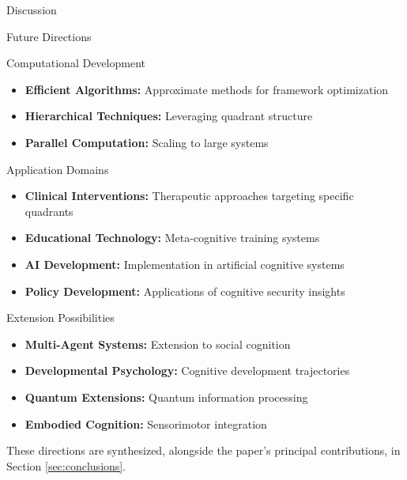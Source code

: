 \documentclass[
  ignorenonframetext,
]{beamer}
\providecommand{\tightlist}{%
  \setlength{\itemsep}{0pt}\setlength{\parskip}{0pt}}
\begin{document}
\begin{frame}{Discussion}
\begin{block}{Future Directions}
\begin{block}{Computational Development}
\protect{}\label{computational-development}
\begin{itemize}
\tightlist
\item
  \textbf{Efficient Algorithms:} Approximate methods for framework
  optimization
\item
  \textbf{Hierarchical Techniques:} Leveraging quadrant structure
\item
  \textbf{Parallel Computation:} Scaling to large systems
\end{itemize}
\end{block}

\begin{block}{Application Domains}
\protect{}\label{application-domains}
\begin{itemize}
\tightlist
\item
  \textbf{Clinical Interventions:} Therapeutic approaches targeting
  specific quadrants
\item
  \textbf{Educational Technology:} Meta-cognitive training systems
\item
  \textbf{AI Development:} Implementation in artificial cognitive
  systems
\item
  \textbf{Policy Development:} Applications of cognitive security
  insights
\end{itemize}
\end{block}

\begin{block}{Extension Possibilities}
\protect{}\label{extension-possibilities}
\begin{itemize}
\tightlist
\item
  \textbf{Multi-Agent Systems:} Extension to social cognition
\item
  \textbf{Developmental Psychology:} Cognitive development trajectories
\item
  \textbf{Quantum Extensions:} Quantum information processing
\item
  \textbf{Embodied Cognition:} Sensorimotor integration
\end{itemize}

These directions are synthesized, alongside the paper's principal
contributions, in Section \ref{sec:conclusions}.
\end{block}
\end{block}
\end{frame}
\end{document}
